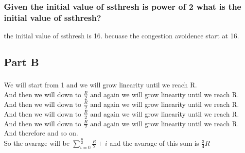 \documentclass{article}
\begin{document}
\subsubsection{Given the initial value of ssthresh is power of 2 what is the initial value of ssthresh?}
the initial value of ssthresh is 16. becuase the congestion avoidence start at 16. 

\subsection{Part B}
\subsubsection{}
We will start from 1 and we will grow linearity until we reach R.\\
And then we will down to $\frac{R}{2}$ and again we will grow linearity until we reach R.\\
And then we will down to $\frac{R}{2}$ and again we will grow linearity until we reach R.\\
And then we will down to $\frac{R}{2}$ and again we will grow linearity until we reach R.\\
And then we will down to $\frac{R}{2}$ and again we will grow linearity until we reach R.\\
And therefore and so on.\\
So the avarage will be $\sum_{i=0}^{\frac{R}{2}} \frac{R}{2}+i$ and the avarage of this sum is $\frac{3}{4}R$

\subsubsection{}

\subsubsection{}

\subsubsection{}
\end{document}
